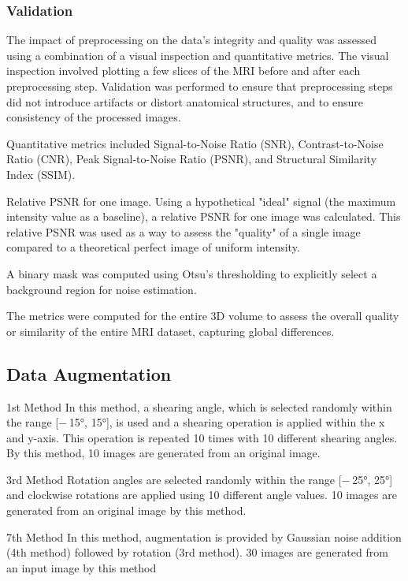\subsubsection{Validation}

The impact of preprocessing on the data's integrity and quality was assessed using a combination of a visual inspection and quantitative metrics. The visual inspection involved plotting a few slices of the MRI before and after each preprocessing step. Validation was performed to ensure that preprocessing steps did not introduce artifacts or distort anatomical structures, and to ensure consistency of the processed images.

Quantitative metrics included Signal-to-Noise Ratio (SNR), Contrast-to-Noise Ratio (CNR), Peak Signal-to-Noise Ratio (PSNR), and 
Structural Similarity Index (SSIM). 

Relative PSNR for one image. Using a hypothetical "ideal" signal (the maximum intensity value as a baseline), a relative PSNR for one image was calculated. This relative PSNR was used as a way to assess the "quality" of a single image compared to a theoretical perfect image of uniform intensity.

A binary mask was computed using Otsu's thresholding to explicitly select a background region for noise estimation.

The metrics were computed for the entire 3D volume to assess the overall quality or similarity of the entire MRI dataset, capturing global differences.


%
\subsection{Data Augmentation}

1st Method In this method, a shearing angle, which is selected randomly within the range [− 15°, 15°], is used and a shearing operation is applied within the x and y-axis. This operation is repeated 10 times with 10 different shearing angles. By this method, 10 images are generated from an original image.

3rd Method Rotation angles are selected randomly within the range [− 25°, 25°] and clockwise rotations are applied using 10 different angle values. 10 images are generated from an original image by this method.

7th Method In this method, augmentation is provided by Gaussian noise addition (4th method) followed by rotation (3rd method). 30 images are generated from an input image by this method

